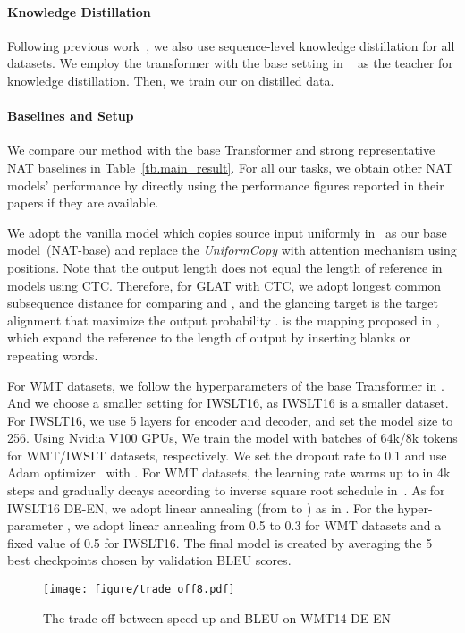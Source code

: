 \paragraph{Knowledge Distillation}
Following previous work~\citep{nat,iter_nat,nat_reg}, we also use sequence-level knowledge distillation for all datasets. 
We employ the transformer with the base setting in ~\citet{transformer} as the teacher for knowledge distillation. Then, we train our \method on distilled data.

\paragraph{Baselines and Setup}
We compare our method with the base Transformer and strong representative NAT baselines in Table~\ref{tb.main_result}.
For all our tasks, we obtain other NAT models' performance by directly using the performance figures reported in their papers if they are available.

We adopt the vanilla model which copies source input uniformly in~\citet{nat} as our base model~(NAT-base) and replace the \textit{UniformCopy} with attention mechanism using positions. 
Note that the output length does not equal the length of reference in models using CTC. Therefore, for GLAT with CTC, we adopt longest common subsequence distance for comparing  and , and the glancing target is the target alignment that maximize the output probability .  is the mapping proposed in \citep{ctc}, which expand the reference to the length of output by inserting blanks or repeating words.

For WMT datasets, we follow the hyperparameters of the base Transformer in \citet{transformer}. And we choose a smaller setting for IWSLT16, as IWSLT16 is a smaller dataset. For IWSLT16, we use 5 layers for encoder and decoder, and set the model size  to 256.
Using Nvidia V100 GPUs, We train the model with batches of 64k/8k tokens for WMT/IWSLT datasets, respectively. We set the dropout rate to 0.1 and use Adam optimizer~\citep{adam} with .
For WMT datasets, the learning rate warms up to  in 4k steps and gradually decays according to inverse square root schedule in~\citet{transformer}. As for IWSLT16 DE-EN, we adopt linear annealing (from  to ) as in \citet{iter_nat}. For the hyper-parameter , we adopt linear annealing from 0.5 to 0.3 for WMT datasets and a fixed value of 0.5 for IWSLT16.
The final model is created by averaging the 5 best checkpoints chosen by validation BLEU scores.

\begin{figure}[!tbp]
\centering
\small
\centering
\texttt{[image: figure/trade\_off8.pdf]}
\caption{The trade-off between speed-up and BLEU on WMT14 DE-EN}
\label{fig.trade_off}
\end{figure}

